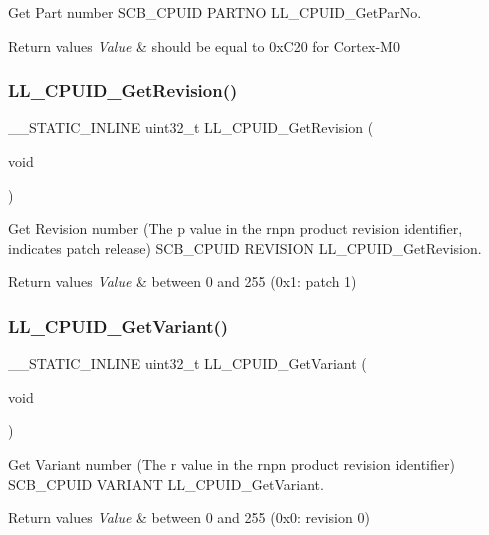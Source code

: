 Get Part number  S\+C\+B\+\_\+\+C\+P\+U\+ID P\+A\+R\+T\+NO L\+L\+\_\+\+C\+P\+U\+I\+D\+\_\+\+Get\+Par\+No. 


\begin{DoxyRetVals}{Return values}
{\em Value} & should be equal to 0x\+C20 for Cortex-\/\+M0 \\
\hline
\end{DoxyRetVals}
\mbox{\label{group___c_o_r_t_e_x___l_l___e_f___m_c_u___i_n_f_o_ga7372821defd92c49ea4563da407acd01}} 
\subsubsection{\texorpdfstring{L\+L\+\_\+\+C\+P\+U\+I\+D\+\_\+\+Get\+Revision()}{LL\_CPUID\_GetRevision()}}
{\footnotesize\ttfamily \+\_\+\+\_\+\+S\+T\+A\+T\+I\+C\+\_\+\+I\+N\+L\+I\+NE uint32\+\_\+t L\+L\+\_\+\+C\+P\+U\+I\+D\+\_\+\+Get\+Revision (\begin{DoxyParamCaption}\item[{void}]{ }\end{DoxyParamCaption})}



Get Revision number (The p value in the rnpn product revision identifier, indicates patch release)  S\+C\+B\+\_\+\+C\+P\+U\+ID R\+E\+V\+I\+S\+I\+ON L\+L\+\_\+\+C\+P\+U\+I\+D\+\_\+\+Get\+Revision. 


\begin{DoxyRetVals}{Return values}
{\em Value} & between 0 and 255 (0x1\+: patch 1) \\
\hline
\end{DoxyRetVals}
\mbox{\label{group___c_o_r_t_e_x___l_l___e_f___m_c_u___i_n_f_o_ga1f843da5f8524bace7fcf8dcce7996cb}} 
\subsubsection{\texorpdfstring{L\+L\+\_\+\+C\+P\+U\+I\+D\+\_\+\+Get\+Variant()}{LL\_CPUID\_GetVariant()}}
{\footnotesize\ttfamily \+\_\+\+\_\+\+S\+T\+A\+T\+I\+C\+\_\+\+I\+N\+L\+I\+NE uint32\+\_\+t L\+L\+\_\+\+C\+P\+U\+I\+D\+\_\+\+Get\+Variant (\begin{DoxyParamCaption}\item[{void}]{ }\end{DoxyParamCaption})}



Get Variant number (The r value in the rnpn product revision identifier)  S\+C\+B\+\_\+\+C\+P\+U\+ID V\+A\+R\+I\+A\+NT L\+L\+\_\+\+C\+P\+U\+I\+D\+\_\+\+Get\+Variant. 


\begin{DoxyRetVals}{Return values}
{\em Value} & between 0 and 255 (0x0\+: revision 0) \\
\hline
\end{DoxyRetVals}
